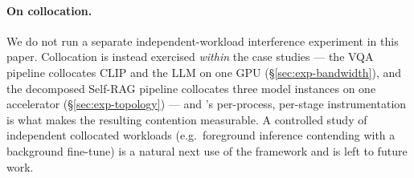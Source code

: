 \paragraph{On collocation.} We do not run a separate independent-workload
interference experiment in this paper. Collocation is instead exercised
\emph{within} the case studies --- the VQA pipeline collocates CLIP and the LLM
on one GPU (\S\ref{sec:exp-bandwidth}), and the decomposed Self-RAG pipeline
collocates three model instances on one accelerator
(\S\ref{sec:exp-topology}) --- and \sysname{}'s per-process, per-stage
instrumentation is what makes the resulting contention measurable. A controlled
study of independent collocated workloads (e.g.\ foreground inference contending
with a background fine-tune) is a natural next use of the framework and is left
to future work.

